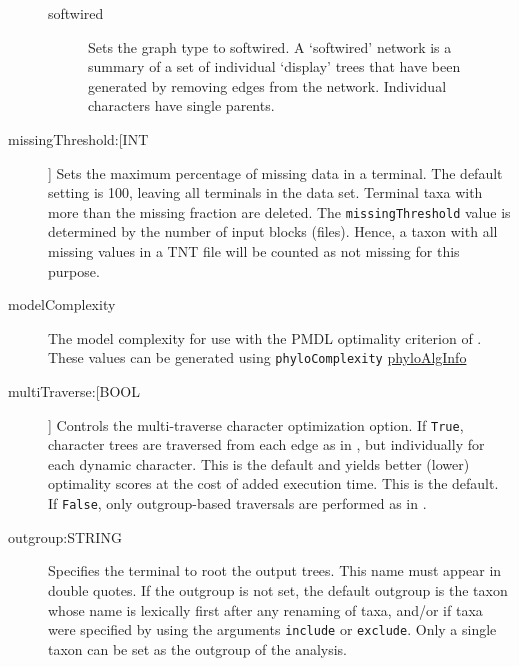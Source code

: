 \begin{description}
\begin{description}
			\item[softwired]  Sets the graph type to softwired. A `softwired' network is 
			a summary of a set of individual `display' trees that have been generated by 
			removing edges from the network. Individual characters have single parents.	
						
		\end{description}
			


		\item[missingThreshold:[INT]] Sets the maximum percentage of missing data in a 
		terminal. The default setting is 100, leaving all terminals in the data set. Terminal taxa
		with more than the missing fraction are deleted.  The \texttt{missingThreshold} value is 
		determined by the number of input blocks (files). Hence, a taxon with all missing values 
		in a TNT file will be counted as not missing for this purpose.   
		
		\item[modelComplexity] The model complexity for use with the PMDL optimality criterion
		of \citep{WheelerandVaron2025}.
		These values can be generated using \texttt{phyloComplexity} 
		\href{https://github.com/amnh/PhyAlgInfo}{phyloAlgInfo}
		
		\item[multiTraverse:[BOOL]] Controls the multi-traverse character optimization 
		option. If \texttt{True}, character trees are traversed from each edge as in 
		\citep{VaronandWheeler2012,VaronandWheeler2013, POY4, POY5}, but 
		individually for each dynamic character. This is the default and yields better 
		(lower) optimality scores at the cost of added execution time. This is the default.
		If \texttt{False}, only outgroup-based traversals are performed as in 
		\citep{Wheeler1996, POY2, POY3}. 
					
		\item[outgroup:STRING] Specifies the terminal to root the output trees. 
		This name must appear in double quotes. If the outgroup is not set, the 
		default outgroup is the taxon whose name is lexically first after any renaming 
		of taxa, and/or if taxa were specified by using the arguments \texttt{include} 
		or \texttt{exclude}. Only a single taxon can be set as the outgroup of the analysis. 
					

\end{description}
